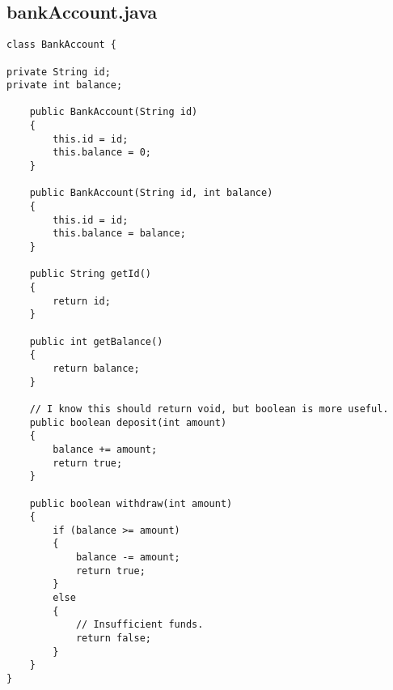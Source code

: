 \documentclass[a4paper,12pt]{article}
\begin{document}
\subsection{\textsf{bankAccount.java}}
\begin{verbatim}
class BankAccount {

private String id;
private int balance;

    public BankAccount(String id)
    {
        this.id = id;
        this.balance = 0;
    }

    public BankAccount(String id, int balance)
    {
        this.id = id;
        this.balance = balance;
    }

    public String getId()
    {
        return id;
    }

    public int getBalance()
    {
        return balance;
    }

    // I know this should return void, but boolean is more useful.
    public boolean deposit(int amount)
    {
        balance += amount;
        return true;
    }

    public boolean withdraw(int amount)
    {
        if (balance >= amount)
        {
            balance -= amount;
            return true;
        }
        else
        {
            // Insufficient funds.
            return false;
        }
    }
}
\end{verbatim}

\newpage
\end{document}
